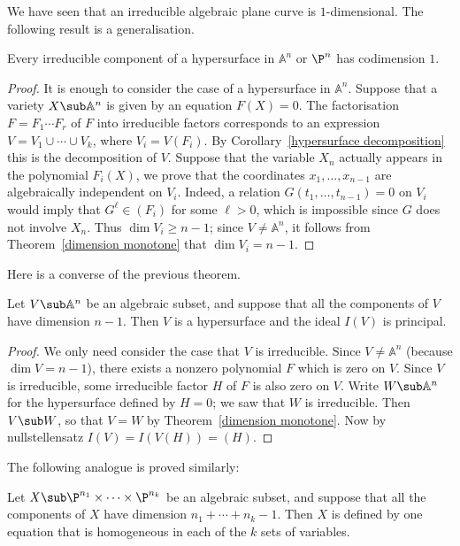 We have seen that an irreducible algebraic plane curve is $1$-dimensional. The
following result is a generalisation.
\begin{theorem}
Every irreducible component of a hypersurface in $\mathbb{A}^n$ or $\P^n$ has codimension $1$.
\end{theorem}
\begin{proof}
It is enough to consider the case of a hypersurface in $\mathbb{A}^n$. Suppose that a variety $X\sub\mathbb{A}^n$ is given by an equation $F(X)=0$. The factorisation $F=F_1\cdots F_r$ of $F$ into irreducible factors corresponds to an expression $V=V_1\cup\cdots\cup V_k$, where $V_i=V(F_i)$. By Corollary~\ref{hypersurface decomposition} this is the decomposition of $V$. Suppose that the variable $X_n$ actually appears in the polynomial $F_i(X)$, we prove that the coordinates $x_1,\dots,x_{n-1}$ are algebraically independent on $V_i$. Indeed, a relation $G(t_1,\dots,t_{n-1})=0$ on $V_i$ would imply that $G^\ell\in(F_i)$ for some $\ell>0$, which is impossible since $G$ does not involve $X_n$. Thus $\dim V_i\geq n-1$; since $V\neq\mathbb{A}^n$, it follows from Theorem~\ref{dimension monotone} that $\dim V_i=n-1$.
\end{proof}
Here is a converse of the previous theorem.
\begin{theorem}
Let $V\sub\mathbb{A}^n$ be an algebraic subset, and suppose that all the components of $V$ have dimension $n-1$. Then $V$ is a hypersurface and the ideal $I(V)$ is principal.
\end{theorem}
\begin{proof}
We only need consider the case that $V$ is irreducible. Since $V\neq\mathbb{A}^n$ (because $\dim V=n-1$), there exists a nonzero polynomial $F$ which is zero on $V$. Since $V$ is irreducible, some irreducible factor $H$ of $F$ is also zero on $V$. Write $W\sub\mathbb{A}^n$ for the hypersurface defined by $H=0$; we saw that $W$ is irreducible. Then $V\sub W$, so that $V=W$ by Theorem~\ref{dimension monotone}. Now by nullstellensatz $I(V)=I(V(H))=(H)$.
\end{proof}
The following analogue is proved similarly:
\begin{theorem}
Let $X\sub\P^{n_1}\times\cdots\times\P^{n_k}$ be an algebraic subset, and suppose that all the components of $X$ have dimension $n_1+\cdots+n_k-1$. Then $X$ is defined by one equation that is homogeneous in each of the $k$ sets of variables.
\end{theorem}
